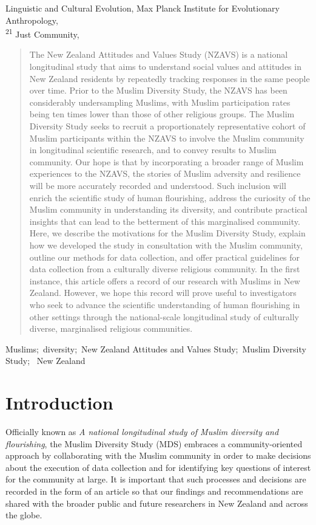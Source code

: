 \documentclass[
]{interact}
\begin{document}
Linguistic and Cultural Evolution, Max Planck Institute for Evolutionary
Anthropology,  \\ \textsuperscript{21}  Just Community,  
\begin{abstract}
The New Zealand Attitudes and Values Study (NZAVS) is a national
longitudinal study that aims to understand social values and attitudes
in New Zealand residents by repeatedly tracking responses in the same
people over time. Prior to the Muslim Diversity Study, the NZAVS has
been considerably undersampling Muslims, with Muslim participation rates
being ten times lower than those of other religious groups. The Muslim
Diversity Study seeks to recruit a proportionately representative cohort
of Muslim participants within the NZAVS to involve the Muslim community
in longitudinal scientific research, and to convey results to Muslim
community. Our hope is that by incorporating a broader range of Muslim
experiences to the NZAVS, the stories of Muslim adversity and resilience
will be more accurately recorded and understood. Such inclusion will
enrich the scientific study of human flourishing, address the curiosity
of the Muslim community in understanding its diversity, and contribute
practical insights that can lead to the betterment of this marginalised
community. Here, we describe the motivations for the Muslim Diversity
Study, explain how we developed the study in consultation with the
Muslim community, outline our methods for data collection, and offer
practical guidelines for data collection from a culturally diverse
religious community. In the first instance, this article offers a record
of our research with Muslims in New Zealand. However, we hope this
record will prove useful to investigators who seek to advance the
scientific understanding of human flourishing in other settings through
the national-scale longitudinal study of culturally diverse,
marginalised religious communities.
\end{abstract}
\begin{keywords}
\def\sep{;\ }
Muslims\sep diversity\sep New Zealand Attitudes and Values
Study\sep Muslim Diversity Study\sep 
New Zealand
\end{keywords}


\section{Introduction}\label{sec-intro}

Officially known as \emph{A national longitudinal study of Muslim
diversity and flourishing}, the Muslim Diversity Study (MDS) embraces a
community-oriented approach by collaborating with the Muslim community
in order to make decisions about the execution of data collection and
for identifying key questions of interest for the community at large. It
is important that such processes and decisions are recorded in the form
of an article so that our findings and recommendations are shared with
the broader public and future researchers in New Zealand and across the
globe.
\end{document}
